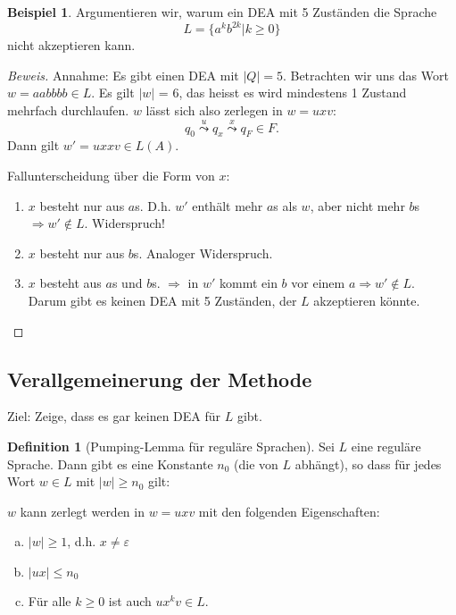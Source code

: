 \documentclass[11pt]{article} %
\theoremstyle{definition}
\newtheorem*{beispiel}{Beispiel}
\newtheorem{definition}{Definition}
\begin{document}
\begin{beispiel}
Argumentieren wir, warum ein DEA mit 5 Zuständen die Sprache
\[
	L = \{a^kb^{2k} | k \ge 0 \}
\]
nicht akzeptieren kann.
\end{beispiel}

\begin{proof}[Beweis]
Annahme: Es gibt einen DEA mit $|Q|=5$. Betrachten wir uns das Wort $w = aabbbb \in L$. Es gilt $|w|$ = 6, das heisst es wird mindestens 1 Zustand mehrfach durchlaufen. $w$ lässt sich also zerlegen in $w = uxv$:
\[
q_0 \overset{u}{\leadsto} q_x \overset{x}{\leadsto} q_F \in F.
\]
Dann gilt $w' = uxxv \in L(A)$.

Fallunterscheidung über die Form von $x$:
\begin{enumerate}
\item $x$ besteht nur aus $a$s. D.h. $w'$ enthält mehr $a$s als $w$, aber nicht mehr $b$s $ \Rightarrow w' \notin L$. Widerspruch!
\item $x$ besteht nur aus $b$s. Analoger Widerspruch.
\item $x$ besteht aus $a$s und $b$s. $\Rightarrow $ in $w'$ kommt ein $b$ vor einem $a \Rightarrow w' \notin L$. Darum gibt es keinen DEA mit 5 Zuständen, der $L$ akzeptieren könnte.
\end{enumerate}
\end{proof}

\subsection{Verallgemeinerung der Methode}

Ziel: Zeige, dass es gar keinen DEA für $L$ gibt.

\begin{definition}[Pumping-Lemma für reguläre Sprachen]

Sei $L$ eine reguläre Sprache. Dann gibt es eine Konstante $n_0$ (die von $L$ abhängt), so dass für jedes Wort $w \in L$ mit $|w| \ge n_0$ gilt:

$w$ kann zerlegt werden in $w = uxv$ mit den folgenden Eigenschaften:
\begin{enumerate}[(a)]
\item $|w| \ge 1$, d.h. $x \neq \varepsilon$
\item $|ux| \le n_0$
\item Für alle $k \ge 0$ ist auch $ux^kv \in L$.
\end{enumerate}

\end{definition}
\end{document}
